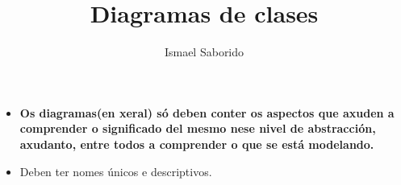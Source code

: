 \documentclass[10pt,a4paper]{book}
\begin{document}
	\title{Diagramas de clases}
	\author{Ismael Saborido}
	\maketitle
	\tableofcontents
	\newpage
	\begin{itemize}
		\item \textbf{Os diagramas(en xeral) só deben conter os aspectos que axuden a comprender o significado del mesmo nese nivel de abstracción, axudanto, entre todos a comprender o que se está modelando.}
		\item Deben ter nomes únicos e descriptivos.
	\end{itemize}
	
\end{document}
